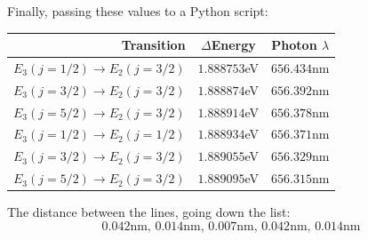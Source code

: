 \documentclass[11pt]{article}
\begin{document}
Finally, passing these values to a Python script:
\begin{table}[!ht]
\centering
\begin{tabular}{r | c c}
Transition & $\Delta$Energy & Photon $\lambda$ \\\hline
$E_3(j=1/2) \rightarrow E_2(j=3/2)$ & $1.888753$eV & $656.434$nm\\
$E_3(j=3/2) \rightarrow E_2(j=3/2)$ & $1.888874$eV & $656.392$nm\\
$E_3(j=5/2) \rightarrow E_2(j=3/2)$ & $1.888914$eV & $656.378$nm\\
$E_3(j=1/2) \rightarrow E_2(j=1/2)$ & $1.888934$eV & $656.371$nm\\
$E_3(j=3/2) \rightarrow E_2(j=3/2)$ & $1.889055$eV & $656.329$nm\\
$E_3(j=5/2) \rightarrow E_2(j=3/2)$ & $1.889095$eV & $656.315$nm\\
\end{tabular}
\end{table}
 	
The distance between the lines, going down the list: 
\[\boxed{0.042 \text{nm, }0.014 \text{nm, }0.007 \text{nm, }0.042\text{nm, }0.014 \text{nm}}\]

\newpage
\end{document}
